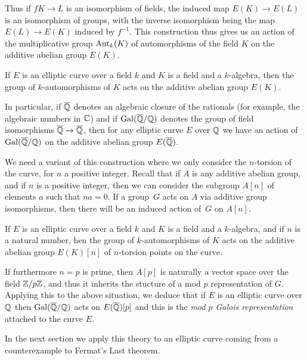  Thus if $f K\to L$ is an isomorphism of fields, the induced map $E(K)\to E(L)$ is an isomorphism of groups, with the inverse isomorphism being the map $E(L)\to E(K)$ induced by $f^{-1}$. This construction thus gives us an action of the multiplicative group $\operatorname{Aut}_k(K)$ of automorphisms of the field $K$ on the additive abelian group $E(K)$. 
 
\begin{definition}\label{EllipticCurve.galoisRepresentation}
  If $E$ is an elliptic curve over a field $k$ and $K$ is a field and a $k$-algebra,
  then the group of $k$-automorphisms of $K$ acts on the additive abelian group $E(K)$.
\end{definition}
 In particular, if $\overline{\mathbb{Q}}$ denotes an algebraic closure of the rationals (for example, the algebraic numbers in $\mathbb{C}$) and if $\operatorname{Gal}(\overline{\mathbb{Q}}/\mathbb{Q})$ denotes the group of field isomorphisms $\overline{\mathbb{Q}}\to\overline{\mathbb{Q}}$, then for any elliptic curve $E$ over $\mathbb{Q}$ we have an action of $\operatorname{Gal}(\overline{\mathbb{Q}}/\mathbb{Q})$ on the additive abelian group $E(\overline{\mathbb{Q}})$.

We need a variant of this construction where we only consider the $n$-torsion of the curve, for $n$ a positive integer. Recall that if $A$ is any additive abelian group, and if $n$ is a positive integer, then we can consider the subgroup $A[n]$ of elements $a$ such that $na=0$. If a group~$G$ acts on $A$ via additive group isomorphisms, then there will be an induced action of~$G$ on $A[n]$. 

\begin{definition}\label{EllipticCurve.torsionGaloisRepresentation}
  If $E$ is an elliptic curve over a field $k$ and $K$ is a field and a $k$-algebra,
  and if $n$ is a natural number, hen the group of $k$-automorphisms of $K$ acts on the additive abelian group $E(K)[n]$ of $n$-torsion points on the curve.
\end{definition}

If furthermore $n=p$ is prime, then $A[p]$ is naturally a vector space over the field $\mathbb{Z}/p\mathbb{Z}$, and thus it inherits the stucture of a mod $p$ representation of $G$. Applying this to the above situation, we deduce that if $E$ is an elliptic curve over $\mathbb{Q}$ then $\operatorname{Gal}(\overline{\mathbb{Q}}/\mathbb{Q})$ acts on $E(\overline{\mathbb{Q}})[p]$ and this is the \emph{mod $p$ Galois representation} attached to the curve $E$.

In the next section we apply this theory to an elliptic curve coming from a counterexample to Fermat's Last theorem.

